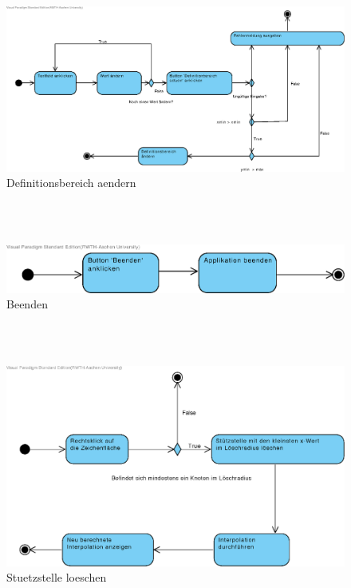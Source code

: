\hfill \\
\hfill \\

\begin{figure}[H]
\centering
\includegraphics[width=\textwidth]{Aktivitaetsdiagramm/definitionbereichAendern.eps}
\caption{Definitionsbereich aendern}
\label{fig:Definitionsbereich aendern}
\end{figure}

\hfill \\
\hfill \\
  
\begin{figure}[H]
\centering
\includegraphics[width=\textwidth]{Aktivitaetsdiagramm/beenden.eps}
\caption{Beenden}
\label{fig:Beenden}
\end{figure}

\hfill \\
\hfill \\

\begin{figure}[H]
\centering
\includegraphics[width=\textwidth]{Aktivitaetsdiagramm/stuetzstelleLoeschen.eps}
\caption{Stuetzstelle loeschen}
\label{fig:Stutzstelle loeschen}
\end{figure}

